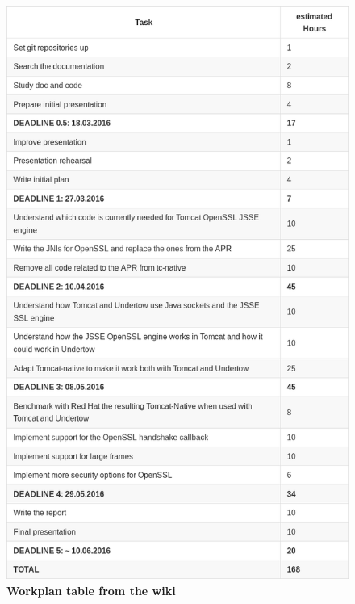 \documentclass[11pt,a4paper,bibliography=totocnumbered]{scrartcl}
\begin{document}
\begin{figure}[h!]
\begin{center}
\includegraphics[scale=0.5]{workplan.png}
\end{center}
\caption{\textbf{Workplan table from the wiki}}
\label{fig:workplan}
\end{figure}

\FloatBarrier
\end{document}
